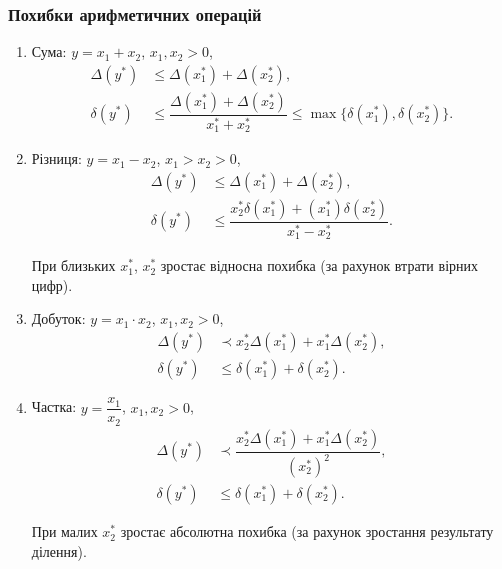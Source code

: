 \subsubsection{Похибки арифметичних операцій}

\begin{enumerate}
	\item Сума: $y = x_1 + x_2$, $x_1, x_2 > 0$, 
	\begin{equation}
		\label{eq:1.17}
		\begin{aligned}
		\Delta (y^*) &\le \Delta (x_1^*) + \Delta (x_2^*), \\ 
		\delta (y^*) &\le \dfrac{\Delta (x_1^*) + \Delta (x_2^*)}{x_1^* + x_2^*} \le \max\{\delta (x_1^*), \delta (x_2^*)\}.
		\end{aligned}
	\end{equation}
	
	\item Різниця: $y = x_1 - x_2$, $x_1 > x_2 > 0$,
	\begin{equation}
		\label{eq:1.18}
		\begin{aligned}
		\Delta (y^*) &\le \Delta (x_1^*) + \Delta (x_2^*), \\
		\delta (y^*) &\le \dfrac{x_2^* \delta (x_1^*) + (x_1^*) \delta (x_2^*)}{x_1^* - x_2^*}.
		\end{aligned}
	\end{equation}
	
	При близьких $x_1^*$, $x_2^*$ зростає відносна похибка (за рахунок втрати вірних цифр).

	\item Добуток: $y = x_1 \cdot x_2$, $x_1, x_2 > 0$,
	\begin{equation}
		\label{eq:1.19}
		\begin{aligned}
		\Delta (y^*) &\prec x_2^* \Delta (x_1^*) + x_1^* \Delta (x_2^*), \\
		\delta (y^*) &\le \delta (x_1^*) + \delta (x_2^*).
		\end{aligned}
	\end{equation}

	\item Частка: $y = \dfrac{x_1}{x_2}$, $x_1, x_2 > 0$,
	\begin{equation}
		\label{eq:1.20}
		\begin{aligned}
		\Delta (y^*) &\prec \dfrac{x_2^* \Delta (x_1^*) + x_1^* \Delta (x_2^*)}{(x_2^*)^2}, \\
		\delta (y^*) &\le \delta (x_1^*) + \delta (x_2^*).
		\end{aligned}
	\end{equation}

	При малих $x_2^*$ зростає абсолютна похибка (за рахунок зростання результату ділення). 
\end{enumerate}

